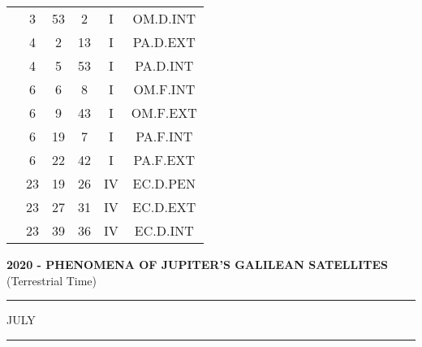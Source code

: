 \documentclass[12pt, a4paper]{article}
\begin{document}
\begin{multicols}{3}
{\begin{tabular}{c c c c c c}
	 	 	 	 & 3 & 53 & 2 & I & OM.D.INT\\%
	 	 	 	 & 4 & 2 & 13 & I & PA.D.EXT\\%
	 	 	 	 & 4 & 5 & 53 & I & PA.D.INT\\%
	 	 	 	 & 6 & 6 & 8 & I & OM.F.INT\\%
	 	 	 	 & 6 & 9 & 43 & I & OM.F.EXT\\%
	 	 	 	 & 6 & 19 & 7 & I & PA.F.INT\\%
	 	 	 	 & 6 & 22 & 42 & I & PA.F.EXT\\%
	 	 	 	 & 23 & 19 & 26 & IV & EC.D.PEN\\%
	 	 	 	 & 23 & 27 & 31 & IV & EC.D.EXT\\%
	 	 	 	 & 23 & 39 & 36 & IV & EC.D.INT\\%
	 	 \end{tabular}
 	}
\end{multicols}
\textbf{2020 - PHENOMENA OF JUPITER'S GALILEAN SATELLITES}\\(Terrestrial Time) 
\vspace{0.1cm} \hrule \vspace{0.1cm}
JULY\vspace{0.1cm}
\hrule
\vspace{-0.2cm}
\end{document}
